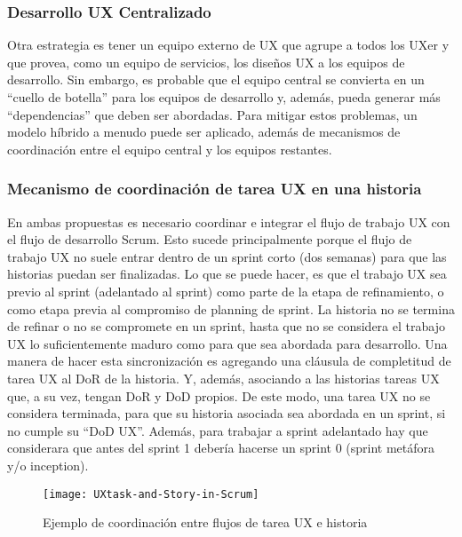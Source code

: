 \subsubsection{Desarrollo UX Centralizado}

Otra estrategia es tener un equipo externo de UX que agrupe a todos los UXer y que provea, como un equipo de servicios, los diseños UX a los equipos de desarrollo. Sin embargo, es probable que el equipo central se convierta en un “cuello de botella” para los equipos de desarrollo y, además, pueda generar más “dependencias” que deben ser abordadas. Para mitigar estos problemas, un modelo híbrido a menudo puede ser aplicado, además de mecanismos de coordinación entre el equipo central y los equipos restantes.

\subsubsection{Mecanismo de coordinación de tarea UX en una historia}

En ambas propuestas es necesario coordinar e integrar el flujo de trabajo UX con el flujo de desarrollo Scrum. Esto sucede principalmente porque el flujo de trabajo UX no suele entrar dentro de un sprint corto (dos semanas) para que las historias puedan ser finalizadas. Lo que se puede hacer, es que el trabajo UX sea previo al sprint (adelantado al sprint) como parte de la etapa de refinamiento, o como etapa previa al compromiso de planning de sprint. La historia no se termina de refinar o no se compromete en un sprint, hasta que no se considera el trabajo UX lo suficientemente maduro como para que sea abordada para desarrollo. Una manera de hacer esta sincronización es agregando una cláusula de completitud de tarea UX al DoR de la historia. Y, además, asociando a las historias tareas UX que, a su vez, tengan DoR y DoD propios. De este modo, una tarea UX no se considera terminada, para que su historia asociada sea abordada en un sprint, si no cumple su “DoD UX”. Además, para trabajar a sprint adelantado hay que considerara que antes del sprint 1 debería hacerse un sprint 0 (sprint metáfora y/o inception).

\begin{figure}[h]
  \centering
  \texttt{[image: UXtask-and-Story-in-Scrum]}
  \caption{Ejemplo de coordinación entre flujos de tarea UX e historia}
  \centering
  \label{fig:UXtask-and-Story-in-Scrum} %
\end{figure}

